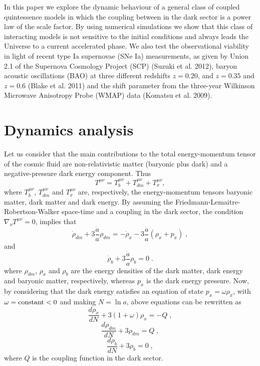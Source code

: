 \documentclass[twocolumn,preprintnumbers,amsmath,amssymb]{revtex4}
\begin{document}
In this paper we explore the dynamic behaviour of a general class of coupled quintessence models in which the coupling 
between in the dark sector is a power law of the scale factor. By using numerical simulations we show that this class 
of interacting models is not sensitive to the initial conditions and always leads the Universe to a current accelerated 
phase. We also test the observational viability in light of recent type Ia supernovae (SNe Ia) measurements, as given 
by Union 2.1 of the Supernova Cosmology Project (SCP) (Suzuki et al. 2012),
baryon acoustic oscillations (BAO) at three different redshifts $z = 0.20$, and $z = 0.35$ and $z = 0.6$ (Blake et al. 2011) and the shift parameter from the three-year Wilkinson Microwave Anisotropy Probe (WMAP) data (Komatsu et al. 2009).


\section{Dynamics analysis}


Let us consider that the main contributions to the total energy-momentum tensor of the cosmic fluid are non-relativistic 
matter (baryonic plus dark) and a negative-pressure dark energy component. Thus
\begin{equation}
{T}^{\mu \nu} = {T}_{b}^{\mu \nu} + {T}_{dm}^{\mu \nu} + {T}_{x}^{\mu \nu},
\end{equation}
where ${T}_{b}^{\mu \nu}$, ${T}_{dm}^{\mu \nu}$ and ${T}_{x}^{\mu \nu}$ are, respectively, the energy-momentum tensors 
baryonic matter, dark matter and dark energy. By assuming the Friedmann-Lemaitre-Robertson-Walker space-time and a 
coupling in the dark sector, the condition $\nabla_{\nu} {T}^{\mu \nu} = 0$, implies that
\begin{equation}\label{coup0}
\dot{\rho}_{dm} + 3 \frac{\dot{a}}{a}\rho_{dm} = -\dot{\rho}_x -
3\frac{\dot{a}}{a}(\rho_x + p_x )\;,
\end{equation}
and 
\begin{equation}
\dot{\rho}_{b} + 3\frac{\dot{a}}{a}{\rho}_{b} = 0\;.
\end{equation}
where $\rho_{dm}$, $\rho_x$ and $\rho_b$ are the energy densities of the dark matter, dark energy and baryonic 
matter, respectively, whereas $p_{x}$ is the dark energy pressure.
Now, by considering that the dark energy satisfies an equation of state $p_x=\omega \rho_x$, with 
$\omega = \rm{constant} < 0$ and making $N = \ln a$, above equations can be rewritten as
\begin{equation}\label{coup1}
\frac{d{\rho}_{x}}{dN} + 3 (1+ \omega){\rho}_x = -Q\;,
\end{equation}
\begin{equation}\label{coup2}
\frac{d{\rho}_{dm}}{dN} + 3{\rho}_{dm} = Q\;,
\end{equation}
\begin{equation}\label{coup3}
\frac{d{\rho}_{b}}{dN} + 3{\rho}_{b} = 0\;,
\end{equation}
where $Q$ is the coupling function in the dark sector.
\end{document}
